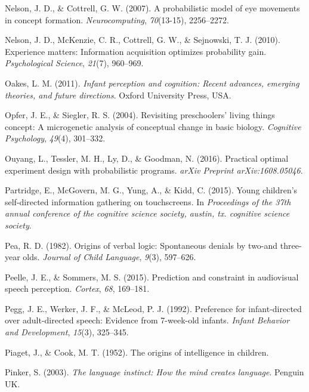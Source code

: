 \documentclass[oneside]{report}
\begin{document}
\hypertarget{ref-nelson2007probabilistic}{}
Nelson, J. D., \& Cottrell, G. W. (2007). A probabilistic model of eye
movements in concept formation. \emph{Neurocomputing}, \emph{70}(13-15),
2256--2272.

\hypertarget{ref-nelson2010experience}{}
Nelson, J. D., McKenzie, C. R., Cottrell, G. W., \& Sejnowski, T. J.
(2010). Experience matters: Information acquisition optimizes
probability gain. \emph{Psychological Science}, \emph{21}(7), 960--969.

\hypertarget{ref-oakes2011infant}{}
Oakes, L. M. (2011). \emph{Infant perception and cognition: Recent
advances, emerging theories, and future directions}. Oxford University
Press, USA.

\hypertarget{ref-opfer2004revisiting}{}
Opfer, J. E., \& Siegler, R. S. (2004). Revisiting preschoolers' living
things concept: A microgenetic analysis of conceptual change in basic
biology. \emph{Cognitive Psychology}, \emph{49}(4), 301--332.

\hypertarget{ref-ouyang2016practical}{}
Ouyang, L., Tessler, M. H., Ly, D., \& Goodman, N. (2016). Practical
optimal experiment design with probabilistic programs. \emph{arXiv
Preprint arXiv:1608.05046}.

\hypertarget{ref-partridge2015young}{}
Partridge, E., McGovern, M. G., Yung, A., \& Kidd, C. (2015). Young
children's self-directed information gathering on touchscreens. In
\emph{Proceedings of the 37th annual conference of the cognitive science
society, austin, tx. cognitive science society}.

\hypertarget{ref-pea1982origins}{}
Pea, R. D. (1982). Origins of verbal logic: Spontaneous denials by
two-and three-year olds. \emph{Journal of Child Language}, \emph{9}(3),
597--626.

\hypertarget{ref-peelle2015prediction}{}
Peelle, J. E., \& Sommers, M. S. (2015). Prediction and constraint in
audiovisual speech perception. \emph{Cortex}, \emph{68}, 169--181.

\hypertarget{ref-pegg1992preference}{}
Pegg, J. E., Werker, J. F., \& McLeod, P. J. (1992). Preference for
infant-directed over adult-directed speech: Evidence from 7-week-old
infants. \emph{Infant Behavior and Development}, \emph{15}(3), 325--345.

\hypertarget{ref-piaget1952origins}{}
Piaget, J., \& Cook, M. T. (1952). The origins of intelligence in
children.

\hypertarget{ref-pinker2003language}{}
Pinker, S. (2003). \emph{The language instinct: How the mind creates
language}. Penguin UK.
\end{document}

